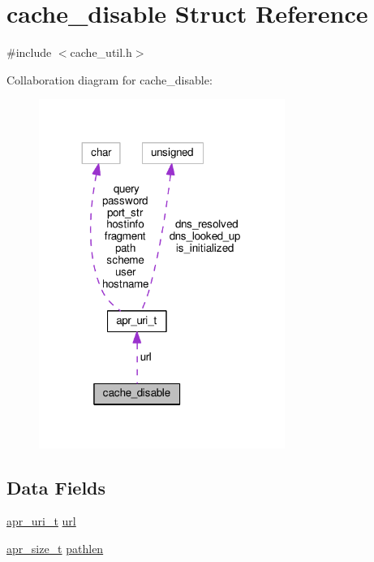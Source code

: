 \hypertarget{structcache__disable}{}\section{cache\+\_\+disable Struct Reference}
\label{structcache__disable}


{\ttfamily \#include $<$cache\+\_\+util.\+h$>$}



Collaboration diagram for cache\+\_\+disable\+:
\nopagebreak
\begin{figure}[H]
\begin{center}
\leavevmode
\includegraphics[width=227pt]{structcache__disable__coll__graph}
\end{center}
\end{figure}
\subsection*{Data Fields}
\begin{DoxyCompactItemize}
\item 
\hyperlink{structapr__uri__t}{apr\+\_\+uri\+\_\+t} \hyperlink{structcache__disable_abef87ff9b23f7bd1d58d0f95a37a26b2}{url}
\item 
\hyperlink{group__apr__platform_gaaa72b2253f6f3032cefea5712a27540e}{apr\+\_\+size\+\_\+t} \hyperlink{structcache__disable_ad7ba683fd82f0243459781622258323c}{pathlen}
\end{DoxyCompactItemize}



